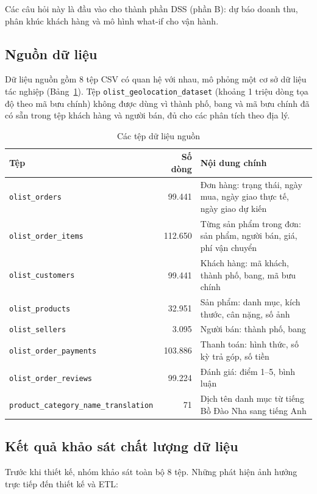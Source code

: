 \documentclass[12pt,a4paper]{article}
\newcommand{\code}[1]{\texttt{\small #1}}
\begin{document}
Các câu hỏi này là đầu vào cho thành phần DSS (phần B): dự báo doanh thu, phân khúc khách hàng và mô hình
what-if cho vận hành.

\subsection{Nguồn dữ liệu}
Dữ liệu nguồn gồm 8 tệp CSV có quan hệ với nhau, mô phỏng một cơ sở dữ liệu tác nghiệp (Bảng~\ref{tab:sources}).
Tệp \code{olist\_geolocation\_dataset} (khoảng 1 triệu dòng tọa độ theo mã bưu chính) không được dùng vì
thành phố, bang và mã bưu chính đã có sẵn trong tệp khách hàng và người bán, đủ cho các phân tích theo địa lý.

\begin{table}[h]
\centering
\caption{Các tệp dữ liệu nguồn}\label{tab:sources}
\small
\begin{tabularx}{\textwidth}{@{}l r X@{}}
\toprule
\textbf{Tệp} & \textbf{Số dòng} & \textbf{Nội dung chính}\\
\midrule
\code{olist\_orders} & 99.441 & Đơn hàng: trạng thái, ngày mua, ngày giao thực tế, ngày giao dự kiến\\
\code{olist\_order\_items} & 112.650 & Từng sản phẩm trong đơn: sản phẩm, người bán, giá, phí vận chuyển\\
\code{olist\_customers} & 99.441 & Khách hàng: mã khách, thành phố, bang, mã bưu chính\\
\code{olist\_products} & 32.951 & Sản phẩm: danh mục, kích thước, cân nặng, số ảnh\\
\code{olist\_sellers} & 3.095 & Người bán: thành phố, bang\\
\code{olist\_order\_payments} & 103.886 & Thanh toán: hình thức, số kỳ trả góp, số tiền\\
\code{olist\_order\_reviews} & 99.224 & Đánh giá: điểm 1--5, bình luận\\
\code{product\_category\_name\_translation} & 71 & Dịch tên danh mục từ tiếng Bồ Đào Nha sang tiếng Anh\\
\bottomrule
\end{tabularx}
\end{table}

\subsection{Kết quả khảo sát chất lượng dữ liệu}
Trước khi thiết kế, nhóm khảo sát toàn bộ 8 tệp. Những phát hiện ảnh hưởng trực tiếp đến thiết kế và ETL:
\end{document}
